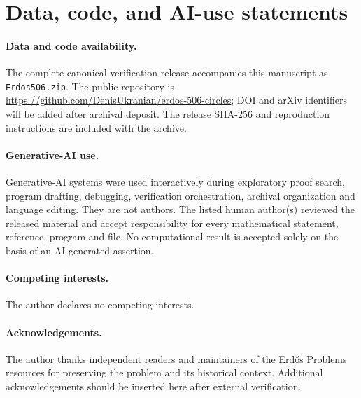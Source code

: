 \section{Data, code, and AI-use statements}

\paragraph{Data and code availability.}
The complete canonical verification release accompanies this manuscript as \texttt{Erdos506.zip}.  The public repository is \url{https://github.com/DenisUkranian/erdos-506-circles}; DOI and arXiv identifiers will be added after archival deposit.  The release SHA-256 and reproduction instructions are included with the archive.

\paragraph{Generative-AI use.}
Generative-AI systems were used interactively during exploratory proof search, program drafting, debugging, verification orchestration, archival organization and language editing.  They are not authors.  The listed human author(s) reviewed the released material and accept responsibility for every mathematical statement, reference, program and file.  No computational result is accepted solely on the basis of an AI-generated assertion.

\paragraph{Competing interests.}
The author declares no competing interests.

\paragraph{Acknowledgements.}
The author thanks independent readers and maintainers of the Erd\H{o}s Problems resources for preserving the problem and its historical context.  Additional acknowledgements should be inserted here after external verification.

